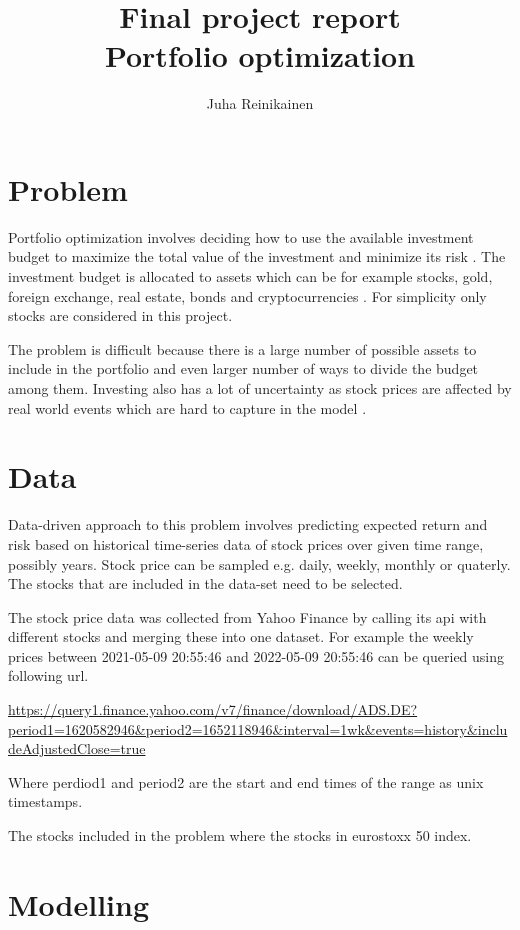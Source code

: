 \documentclass[11pt]{article} %
\title{Final project report\\
	   Portfolio optimization}
\author{Juha Reinikainen}
\begin{document}
\maketitle

\section{Problem}

Portfolio optimization involves deciding how to use the available investment budget to maximize the total value of the investment and minimize its risk \cite{van2021parden}. The investment budget is allocated to assets which can be for example stocks, gold, foreign exchange, real estate, bonds and cryptocurrencies \cite{faizan2019multiobjective}. For simplicity only stocks are considered in this project.

The problem is difficult because there is a large number of possible assets to include in the portfolio and even larger number of ways to divide the budget among them. Investing also has a lot of uncertainty as stock prices are affected by real world events which are hard to capture in the model \cite{du2020new}.

\section{Data}

Data-driven approach to this problem involves predicting expected return and risk based on historical time-series data of stock prices over given time range, possibly years. Stock price can be sampled e.g. daily, weekly, monthly or quaterly. The stocks that are included in the data-set need to be selected.

The stock price data was collected from Yahoo Finance by calling its api with different stocks and merging these into one dataset. For example the weekly prices between 2021-05-09 20:55:46 and 2022-05-09 20:55:46 can be queried using following url.

\url{https://query1.finance.yahoo.com/v7/finance/download/ADS.DE?period1=1620582946&period2=1652118946&interval=1wk&events=history&includeAdjustedClose=true}

Where perdiod1 and period2 are the start and end times of the range as unix timestamps. 

The stocks included in the problem where the stocks in eurostoxx 50 index.


\section{Modelling}
\end{document}
